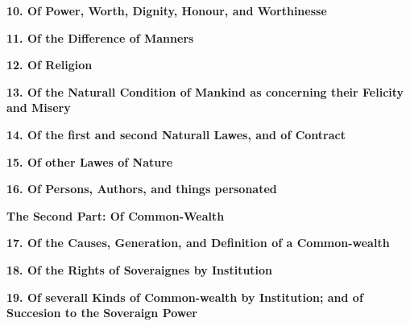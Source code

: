 \documentclass[11pt]{article}
\newcommand{\sectiontitle}[1]{{\Large {\bfseries #1}}}
\newcommand{\chapter}[1]{{\bfseries #1}}
\begin{document}
\chapter{10. Of Power, Worth, Dignity, Honour, and Worthinesse}

\chapter{11. Of the Difference of Manners}

\chapter{12. Of Religion}

\chapter{13. Of the Naturall Condition of Mankind as concerning their Felicity
and Misery}

\chapter{14. Of the first and second Naturall Lawes, and of Contract}

\chapter{15. Of other Lawes of Nature}

\chapter{16. Of Persons, Authors, and things personated}

\sectiontitle{The Second Part: Of Common-Wealth}

\chapter{17. Of the Causes, Generation, and Definition of a Common-wealth}

\chapter{18. Of the Rights of Soveraignes by Institution}

\chapter{19. Of severall Kinds of Common-wealth by Institution;
and of Succesion to the Soveraign Power}
\end{document}
